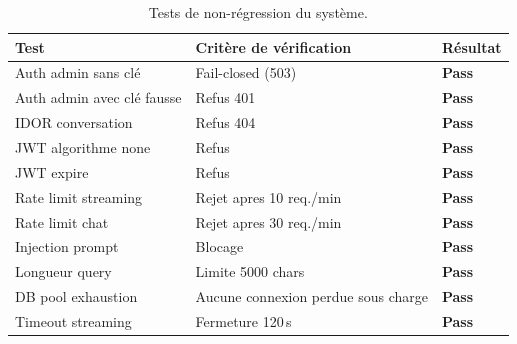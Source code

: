 \documentclass[12pt,a4paper,oneside]{report}
\begin{document}
\begin{table}[htbp]\centering

\begin{tabular}{@{}p{5cm}p{3cm}p{2cm}@{}}

\toprule

\textbf{Test} & \textbf{Crit\`{e}re de v\'{e}rification} & \textbf{R\'{e}sultat} \\

\midrule

Auth admin sans cl\'{e} & Fail-closed (503) & \textcolor{success}{\textbf{Pass}} \\

Auth admin avec cl\'{e} fausse & Refus 401 & \textcolor{success}{\textbf{Pass}} \\

IDOR conversation & Refus 404 & \textcolor{success}{\textbf{Pass}} \\

JWT algorithme none & Refus & \textcolor{success}{\textbf{Pass}} \\

JWT expire & Refus & \textcolor{success}{\textbf{Pass}} \\

Rate limit streaming & Rejet apres 10 req./min & \textcolor{success}{\textbf{Pass}} \\

Rate limit chat & Rejet apres 30 req./min & \textcolor{success}{\textbf{Pass}} \\

Injection prompt & Blocage & \textcolor{success}{\textbf{Pass}} \\

Longueur query & Limite 5000 chars & \textcolor{success}{\textbf{Pass}} \\

DB pool exhaustion & Aucune connexion perdue sous charge & \textcolor{success}{\textbf{Pass}} \\

Timeout streaming & Fermeture 120\,s & \textcolor{success}{\textbf{Pass}} \\

\bottomrule

\end{tabular}

\caption{Tests de non-r\'{e}gression du syst\`{e}me.}\label{tab:regression}

\end{table}
\end{document}
